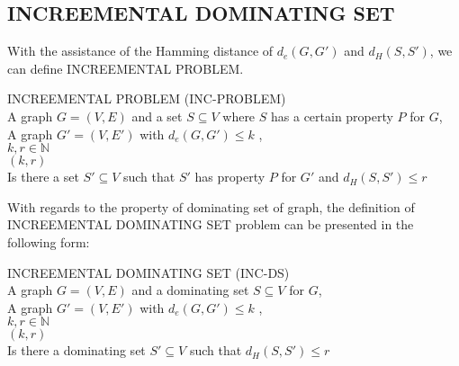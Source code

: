\subsection{\large{I}\normalsize{NCREEMENTAL} \large{D}\normalsize{OMINATING} \Large{S}\normalsize{ET}}\label{subsec:incds}
With the assistance of the Hamming distance of $d_e$$(G,G')$ and $d_H$$(S,S')$, we can define \large{I}\normalsize{NCREEMENTAL} \large{P}\normalsize{ROBLEM}.
\begin{dproblem}
{\sc \large{I}\normalsize{NCREEMENTAL} \large{P}\normalsize{ROBLEM} (\large{I}\normalsize{NC}-\large{P}\normalsize{ROBLEM})}\\
\instance A graph $G=(V,E)$ and a set $S \subseteq V$ where $S$ has a certain property  $P$ for $G$,\\
  A graph $G'=(V,E')$ with $d_e$$(G,G') \leqslant k$ , \\
  $k,r \in \mathds{N}$ \\
\parameter $(k,r)$ \\
\ques Is there a set $S' \subseteq V$ such that $S'$ has property  $P$ for $G'$ and $d_H$$(S,S') \leqslant r$\\
\cite{downey2014}
\end{dproblem}
With regards to the property of dominating set of graph, the definition of \large{I}\normalsize{NCREEMENTAL} \large{D}\normalsize{OMINATING}  \Large{S}\normalsize{ET} problem can be presented in the following form:
\begin{dproblem}
{\sc \large{I}\normalsize{NCREEMENTAL} \large{D}\normalsize{OMINATING}  \Large{S}\normalsize{ET} \large{(}\large{I}\normalsize{NC}-\large{DS}\large{)}}\\
\instance A graph $G=(V,E)$ and a dominating set $S \subseteq V$ for $G$,\\
  A graph $G'=(V,E')$ with $d_e$$(G,G') \leqslant k$ , \\
  $k,r \in \mathds{N}$ \\
\parameter $ (k,r)$ \\
\ques  Is there a dominating set $S' \subseteq V$ such that $d_H$$(S,S') \leqslant r$\\
\cite{downey2014}
\end{dproblem}
